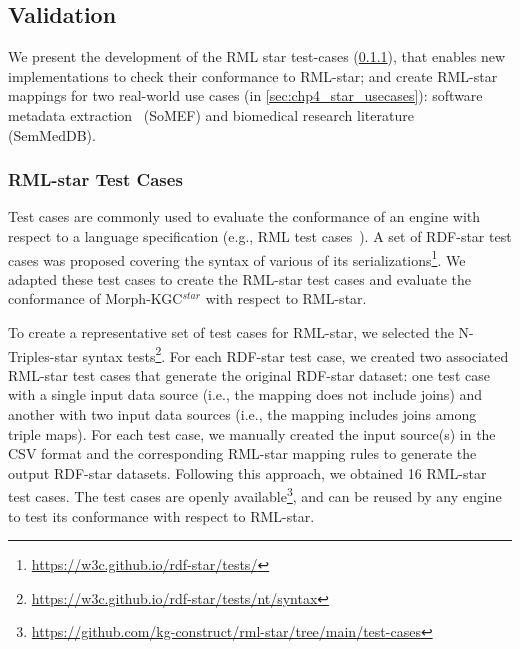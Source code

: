 \subsection{Validation}
\label{sec:chp4_validation}

We present the development of the RML star test-cases (\cref{sec:chp4_star_testcases}), that enables new implementations to check their conformance to RML-star; and create RML-star mappings for two real-world use cases (in \cref{sec:chp4_star_usecases}): software metadata extraction~\cite{kelley2021framework} (SoMEF) and biomedical research literature~\cite{SemMedDB} (SemMedDB). 




\subsubsection{RML-star Test Cases}
\label{sec:chp4_star_testcases}

Test cases are commonly used %
to evaluate the conformance of an engine with respect to a language specification (e.g., RML test cases~\cite{heyvaert2019conformance}). 
A set of \mbox{RDF-star} test cases was proposed
covering the syntax of various of its serializations\footnote{\url{https://w3c.github.io/rdf-star/tests/}}.
We adapted these test cases to create the RML-star test cases and evaluate the conformance of \mbox{Morph-KGC$^{star}$}
with respect to \mbox{RML-star}.

To create a representative set of test cases for \mbox{RML-star}, we selected the N-Triples-star syntax tests\footnote{\url{https://w3c.github.io/rdf-star/tests/nt/syntax}}.  %
For each \mbox{RDF-star} test case, we created two associated \mbox{RML-star} test cases that generate the original \mbox{RDF-star} dataset: one test case with a single input data source (i.e., the mapping does not include joins) and another with two input data sources (i.e., the mapping includes joins among triple maps).
For each test case, we manually created the input source(s) in the CSV format and the corresponding \mbox{RML-star} mapping rules to generate the output \mbox{RDF-star} datasets.
Following this approach, we obtained 16 \mbox{RML-star} test cases.
The test cases are openly available\footnote{\url{https://github.com/kg-construct/rml-star/tree/main/test-cases}},
and can be reused by any engine to test its conformance with respect to \mbox{RML-star}.


